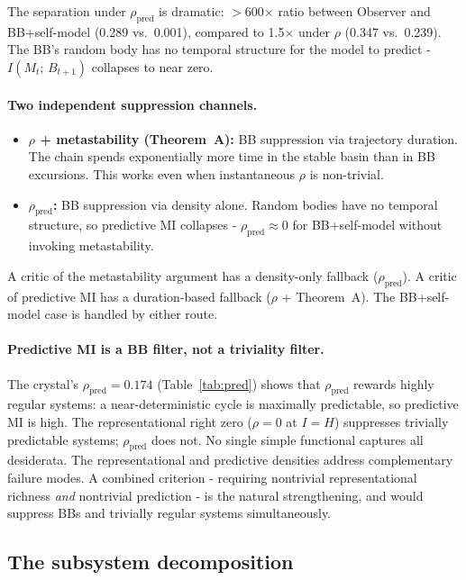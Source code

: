 \documentclass[12pt]{article}
\theoremstyle{remark}
\begin{document}
The separation under $\rho_{\mathrm{pred}}$ is dramatic: $>$600$\times$ ratio between Observer and BB+self-model (0.289 vs.\ 0.001), compared to 1.5$\times$ under $\rho$ (0.347 vs.\ 0.239). The BB's random body has no temporal structure for the model to predict - $I(M_t;\,B_{t+1})$ collapses to near zero.

\paragraph{Two independent suppression channels.}
\begin{itemize}[leftmargin=2em]
\item \textbf{$\rho$ + metastability (Theorem~A):} BB suppression via trajectory duration. The chain spends exponentially more time in the stable basin than in BB excursions. This works even when instantaneous $\rho$ is non-trivial.
\item \textbf{$\rho_{\mathrm{pred}}$:} BB suppression via density alone. Random bodies have no temporal structure, so predictive MI collapses - $\rho_{\mathrm{pred}} \approx 0$ for BB+self-model without invoking metastability.
\end{itemize}

A critic of the metastability argument has a density-only fallback ($\rho_{\mathrm{pred}}$). A critic of predictive MI has a duration-based fallback ($\rho$ + Theorem~A). The BB+self-model case is handled by either route.

\paragraph{Predictive MI is a BB filter, not a triviality filter.} The crystal's $\rho_{\mathrm{pred}} = 0.174$ (Table~\ref{tab:pred}) shows that $\rho_{\mathrm{pred}}$ rewards highly regular systems: a near-deterministic cycle is maximally predictable, so predictive MI is high. The representational right zero ($\rho = 0$ at $I = H$) suppresses trivially predictable systems; $\rho_{\mathrm{pred}}$ does not. No single simple functional captures all desiderata. The representational and predictive densities address complementary failure modes. A combined criterion - requiring nontrivial representational richness \emph{and} nontrivial prediction - is the natural strengthening, and would suppress BBs and trivially regular systems simultaneously.

\subsection{The subsystem decomposition}\label{sec:subsystem}
\end{document}
